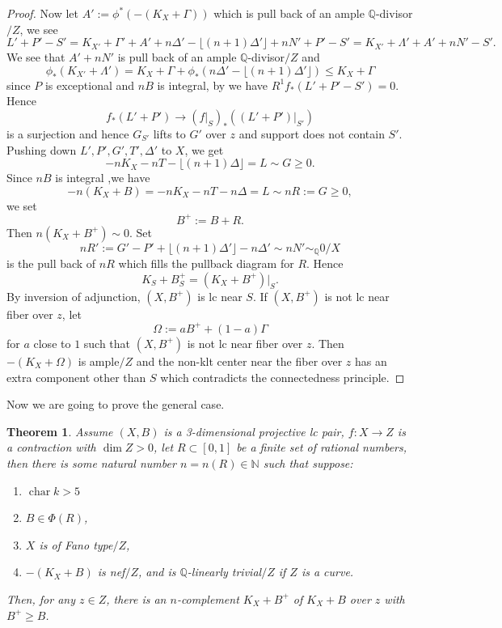 \documentclass[letterpaper,reqno,12pt]{amsart}
\DeclareMathOperator{\chara}{char}
\numberwithin{equation}{section}
\theoremstyle{plain}
\newtheorem{theorem}{Theorem}[section]
\begin{document}
\begin{proof}
    Now let $A':=\phi^*(-(K_X+\Gamma))$ which is pull back of an ample ${\mathbb Q}$-divisor$/Z$, we see \[L'+P'-S'=K_{X'}+\Gamma'+A'+n\Delta'-\lfloor(n+1)\Delta'\rfloor+nN'+P'-S'=K_{X'}+\Lambda'+A'+nN'-S'.\] We see that $A'+nN'$ is pull back of an ample ${\mathbb Q}$-divisor$/Z$ and 
    \[\phi_*(K_{X'}+\Lambda')=K_X+\Gamma+\phi_*(n\Delta'-\lfloor(n+1)\Delta'\rfloor)\leq K_X+\Gamma\] since $P$ is exceptional and $nB$ is integral,  by  we have $R^1f_*(L'+P'-S')=0$. Hence \[f_*(L'+P')\to (f|_S)_*((L'+P')|_{S'})\] is a surjection and hence $G_{S'}$ lifts to $G'$ over $z$ and support does not contain $S'$.  Pushing down $L',P',G',T',\Delta'$ to $X$, we get \[-nK_X-nT-\lfloor(n+1)\Delta\rfloor=L\sim G\geq 0.\] Since $nB$ is integral ,we have \[-n(K_X+B)=-nK_X-nT-n\Delta=L\sim nR:=G\geq 0,\] we set \[B^+:=B+R.\]
    Then $n(K_X+B^+)\sim 0$. Set \[nR':=G'-P'+\lfloor (n+1)\Delta'\rfloor-n\Delta'\sim nN'\sim_{\mathbb Q}0/X\] is the pull back of $nR$ which fills the pullback diagram for $R$. Hence \[K_S+B_S^+=(K_X+B^+)|_{S}.\] By inversion of adjunction, $(X,B^+)$ is lc near $S$. If $(X,B^+)$ is not lc near fiber over $z$, let \[\Omega:=aB^++(1-a)\Gamma\] for $a$ close to $1$ such that $(X,B^+)$ is not lc near fiber over $z$. Then $-(K_X+\Omega)$ is ample$/Z$ and the non-klt center near the fiber over $z$ has an extra component other than $S$ which contradicts the connectedness principle.
\end{proof}
Now we are going to prove the general case.
\begin{theorem}
\label{relacomp1}
    Assume $(X,B)$ is a 3-dimensional projective lc pair, $f:X\to Z$ is a contraction with $\dim Z>0$, let $R\subset [0,1]$ be a finite set of rational numbers, then there is some natural number $n=n(R)\in\mathbb N$ such that suppose:
    \begin{enumerate}
        \item $\chara k>5$
        \item $B\in\Phi(R)$,
        \item $X$ is of Fano type$/Z$,
        \item $-(K_X+B)$ is nef$/Z$, and is $\mathbb Q$-linearly trivial$/Z$ if $Z$ is a curve.
    \end{enumerate}
    Then, for any $z\in Z$, there is an $n$-complement $K_X+B^+$ of $K_X+B$ over $z$ with $B^+\geq B$.
\end{theorem}
\end{document}
